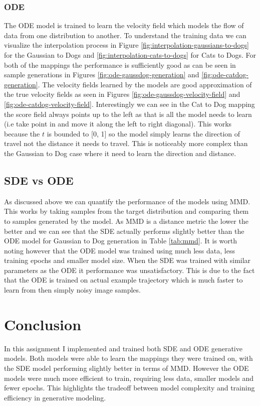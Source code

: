 \documentclass[conference,a4paper]{IEEEtran}
\begin{document}
\subsubsection{ODE}
The ODE model is trained to learn the velocity field which models the flow of data from one distribution to another. To understand the training data we can visualize the interpolation process in Figure \ref{fig:interpolation-gaussians-to-dogs} for the Gaussian to Dogs  and \ref{fig:interpolation-cats-to-dogs} for Cats to Dogs. For both of the mappings the performance is sufficiently good as can be seen in sample generations in Figures \ref{fig:ode-gaussdog-generation} and \ref{fig:ode-catdog-generation}. The velocity fields learned by the models are good approximation of the true velocity fields as seen in Figures \ref{fig:ode-gaussdog-velocity-field} and \ref{fig:ode-catdog-velocity-field}. Interestingly we can see in the Cat to Dog mapping the score field always points up to the left as that is all the model needs to learn (i.e take point in and move it along the left to right diagonal). This works because the $t$ is bounded to [0, 1] so the model simply learns the direction of travel not the distance it needs to travel. This is noticeably more complex than the Gaussian to Dog case where it need to learn the direction and distance.

\subsection{SDE vs ODE}

As discussed above we can quantify the performance of the models using MMD. This works by taking samples from the target distribution and comparing them to samples generated by the model. As MMD is a distance metric the lower the better and we can see that the SDE actually performs slightly better than the ODE model for Gaussian to Dog generation in Table \ref{tab:mmd}. It is worth noting however that the ODE model was trained using much less data, less training epochs and smaller model size. When the SDE was trained with similar parameters as the ODE it performance was unsatisfactory. This is due to the fact that the ODE is trained on actual example trajectory which is much faster to learn from then simply noisy image samples.
\section{Conclusion}

In this assignment I implemented and trained both SDE and ODE generative models. Both models were able to learn the mappings they were trained on, with the SDE model performing slightly better in terms of MMD. However the ODE models were much more efficient to train, requiring less data, smaller models and fewer epochs. This highlights the tradeoff between model complexity and training efficiency in generative modeling.
\end{document}
